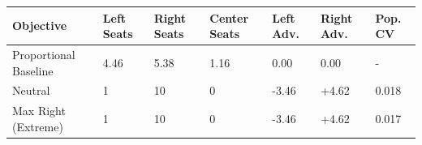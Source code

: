 \begin{tabular}{lllllll}
\toprule
Objective & Left Seats & Right Seats & Center Seats & Left Adv. & Right Adv. & Pop. CV \\
\midrule
Proportional Baseline & 4.46 & 5.38 & 1.16 & 0.00 & 0.00 & - \\
Neutral & 1 & 10 & 0 & -3.46 & +4.62 & 0.018 \\
Max Right (Extreme) & 1 & 10 & 0 & -3.46 & +4.62 & 0.017 \\
\bottomrule
\end{tabular}
